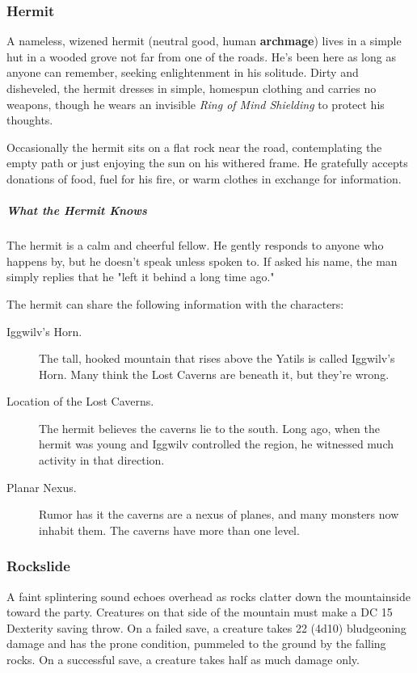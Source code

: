 \documentclass[10pt,a4paper,twoside,bg=print,twocolumn,openany,nodeprecatedcode]{dndbook}
\begin{document}
\subsubsection{Hermit}
A nameless, wizened hermit (neutral good, human \textbf{archmage}) lives in a simple hut in a wooded grove not far from one of the roads. He's been here as long as anyone can remember, seeking enlightenment in his solitude. Dirty and disheveled, the hermit dresses in simple, homespun clothing and carries no weapons, though he wears an invisible \textit{Ring of Mind Shielding} to protect his thoughts.

Occasionally the hermit sits on a flat rock near the road, contemplating the empty path or just enjoying the sun on his withered frame. He gratefully accepts donations of food, fuel for his fire, or warm clothes in exchange for information.

\subparagraph{What the Hermit Knows}
The hermit is a calm and cheerful fellow. He gently responds to anyone who happens by, but he doesn't speak unless spoken to. If asked his name, the man simply replies that he "left it behind a long time ago."

The hermit can share the following information with the characters:


\begin{description}
\item[Iggwilv's Horn.]
The tall, hooked mountain that rises above the Yatils is called Iggwilv's Horn. Many think the Lost Caverns are beneath it, but they're wrong.
\item[Location of the Lost Caverns.]
The hermit believes the caverns lie to the south. Long ago, when the hermit was young and Iggwilv controlled the region, he witnessed much activity in that direction.
\item[Planar Nexus.]
Rumor has it the caverns are a nexus of planes, and many monsters now inhabit them. The caverns have more than one level.
\end{description}

\subsubsection{Rockslide}
A faint splintering sound echoes overhead as rocks clatter down the mountainside toward the party. Creatures on that side of the mountain must make a DC 15 Dexterity saving throw. On a failed save, a creature takes 22 (4d10) bludgeoning damage and has the prone condition, pummeled to the ground by the falling rocks. On a successful save, a creature takes half as much damage only.
\end{document}

